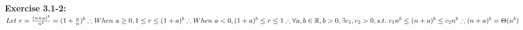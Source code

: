 \documentclass{article}
\begin{document}
\begin{spacing}{2.0}
\noindent
\textbf{Exercise 3.1-2:}\\
$
Let\ r = \frac{(n + a)^b}{n^b} = (1 + \frac{a}{n})^b\\
\therefore When\ a \ge 0, 1 \le r \le (1 + a) ^ b\\
\therefore When\ a < 0, (1 + a) ^ b \le r \le 1\\
\therefore \forall a, b \in \mathbb{R}, b > 0, \exists c_1, c_2 > 0, s.t.\ c_1n^b \le (n + a) ^ b \le c_2n^b\ \\
\therefore (n + a) ^ b = \Theta(n ^ b)\\
$
\end{spacing}
\end{document}
